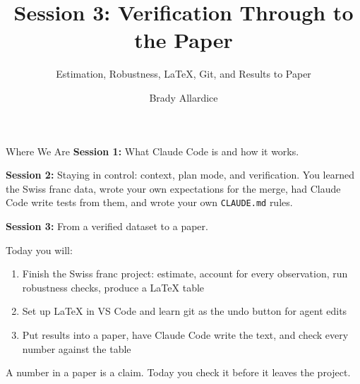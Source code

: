 \documentclass[aspectratio=169, 11pt]{beamer}
\title{Session 3: Verification Through to the Paper}
\subtitle{Estimation, Robustness, \LaTeX{}, Git, and Results to Paper}
\author{Brady Allardice}
\date{}
\institute{UPF \& IBEI}
\begin{document}
\begin{frame}[plain]
  \titlepage
\end{frame}


\begin{frame}{Where We Are}
  \textbf{Session 1:} What Claude Code is and how it works.

  \vspace{0.5em}
  \textbf{Session 2:} Staying in control: context, plan mode, and verification. You learned the Swiss franc data, wrote your own expectations for the merge, had Claude Code write tests from them, and wrote your own \texttt{CLAUDE.md} rules.

  \vspace{0.5em}
  \textbf{Session 3:} From a verified dataset to a paper.

  \vspace{0.8em}
  Today you will:
  \begin{enumerate}
    \item Finish the Swiss franc project: estimate, account for every observation, run robustness checks, produce a \LaTeX{} table
    \item Set up \LaTeX{} in VS Code and learn git as the undo button for agent edits
    \item Put results into a paper, have Claude Code write the text, and check every number against the table
  \end{enumerate}

  \vspace{0.5em}
  \alert{A number in a paper is a claim. Today you check it before it leaves the project.}
\end{frame}
\end{document}

